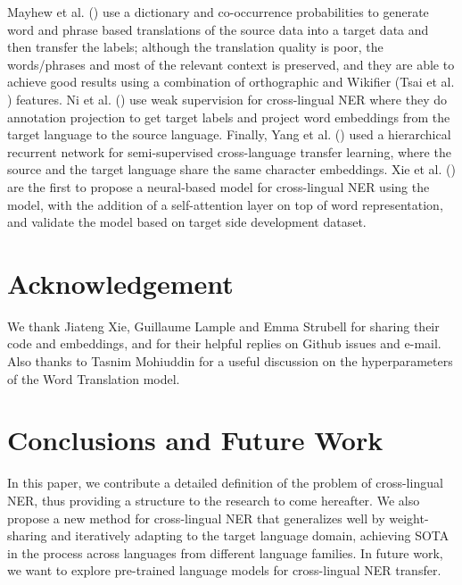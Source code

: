 \documentclass[letterpaper]{article} \usepackage{aaai20}  \usepackage{times}  \usepackage{helvet} \usepackage{courier}  \usepackage[hyphens]{url}  \usepackage{graphicx} \urlstyle{rm} \def\UrlFont{\rm}  \usepackage{graphicx}  \frenchspacing  \setlength{\pdfpagewidth}{8.5in}  \setlength{\pdfpageheight}{11in}
\begin{document}
 Mayhew et al. (\citeyear{Mayhew2017CheapTF}) use a dictionary and co-occurrence probabilities to generate word and phrase based translations of the source data into a target data and then transfer the labels; although the translation quality is poor, the words/phrases and most of the relevant context is preserved, and they are able to achieve good results using a combination of orthographic and Wikifier (Tsai et al. \citeyear{Tsai2016CrossLingualNE})  features. Ni et al. (\citeyear{DBLP:journals/corr/NiDF17}) use weak supervision for cross-lingual NER where they do annotation projection to get target labels and project word embeddings from the target language to the source language. Finally, Yang et al. (\citeyear{ICLR2017:TransferLearning}) used a hierarchical recurrent network for semi-supervised cross-language transfer learning, where the source and the target language share the same character embeddings. 
  Xie et al. (\citeyear{cross-ling-cmu}) are the first to propose a neural-based model for cross-lingual NER using the \cite{lampleNER} model, with the addition of a self-attention layer on top of word representation, and validate the model based on target side development dataset.


\section{Acknowledgement}
We thank Jiateng Xie, Guillaume Lample and Emma Strubell for sharing their code and embeddings, and  for their helpful replies on Github issues and e-mail. Also thanks to Tasnim Mohiuddin for a useful discussion on the  hyperparameters of the Word Translation model.

\section{Conclusions and Future Work}
In this paper, we contribute a detailed definition of the problem of cross-lingual NER, thus providing a structure to the research to come hereafter. We also propose a new method for cross-lingual NER that generalizes well by weight-sharing and iteratively adapting to the target language domain, achieving SOTA in the process across languages from different language families.
In future work, we want to explore pre-trained language models for cross-lingual NER transfer.




\end{document}

